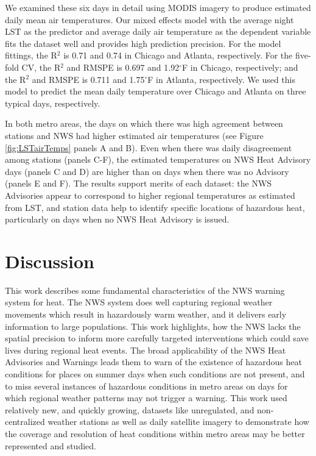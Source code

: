 \documentclass{ametsoc}
\begin{document}
We examined these six days in detail using MODIS imagery to produce estimated daily mean air temperatures. Our mixed effects model with the average night LST as the predictor and average daily air temperature as the dependent variable fits the dataset well and provides high prediction precision. For the model fittings, the R$^2$ is 0.71 and 0.74 in Chicago and Atlanta, respectively. For the five-fold CV, the R$^2$ and RMSPE is 0.697 and 1.92$^{\circ}$F in Chicago, respectively; and the R$^2$ and RMSPE is 0.711 and 1.75$^{\circ}$F in Atlanta, respectively. We used this model to predict the mean daily temperature over Chicago and Atlanta on three typical days, respectively.  

In both metro areas, the days on which there was high agreement between stations and NWS had higher estimated air temperatures (see Figure \ref{fig:LSTairTemps} panels A and B). Even when there was daily disagreement among stations (panels C-F), the estimated temperatures on NWS Heat Advisory days (panels C and D) are higher than on days when there was no Advisory (panels E and F). The results support merits of each dataset: the NWS Advisories appear to correspond to higher regional temperatures as estimated from LST, and station data help to identify specific locations of hazardous heat, particularly on days when no NWS Heat Advisory is issued. 

\section{Discussion}\label{section:discussion}

This work describes some fundamental characteristics of the NWS warning system for heat. The NWS system does well capturing regional weather movements which result in hazardously warm weather, and it delivers early information to large populations. This work highlights, how the NWS lacks the spatial precision to inform more carefully targeted interventions which could save lives during regional heat events. The broad applicability of the NWS Heat Advisories and Warnings leads them to warn of the existence of hazardous heat conditions for places on summer days when such conditions are not present, and to miss several instances of hazardous conditions in metro areas on days for which regional weather patterns may not trigger a warning. This work used relatively new, and quickly growing, datasets like unregulated, and non-centralized weather stations as well as daily satellite imagery to demonstrate how the coverage and resolution of heat conditions within metro areas may be better represented and studied.  
\end{document}

